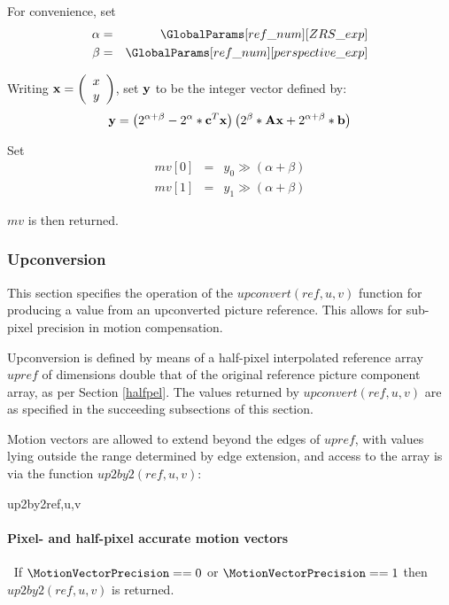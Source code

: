For convenience, set
\begin{eqnarray*} 
\alpha & = & \GlobalParams[ref\_num][ZRS\_exp] \\
\beta & = & \GlobalParams[ref\_num][perspective\_exp]
\end{eqnarray*}

Writing ${\bf x}=\left( \begin{array}{c} x\\y \end{array}\right)$, set ${\bf y}$ to be
the integer vector defined by:
\begin{equation*}
{\bf y}=\left(2^{\alpha+\beta}-2^\alpha * {\bf c}^T {\bf x}\right)\left(2^\beta*{\bf Ax}+2^{\alpha+\beta}*{\bf b}\right)
\end{equation*}

Set
\begin{eqnarray*}
mv[0] & = & y_0\gg (\alpha+\beta) \\
mv[1] & = & y_1\gg (\alpha+\beta)
\end{eqnarray*}

$mv$ is then returned.

\subsubsection{Upconversion}
\label{upconvert}

This section specifies the operation of the $upconvert(ref, u, v)$ function
for producing a value from an upconverted picture reference. This
allows for sub-pixel precision in motion compensation. 

Upconversion is defined by means of a half-pixel interpolated reference array
$upref$ of dimensions double that of the original reference picture component
array, as per Section \ref{halfpel}. The values returned by $upconvert(ref,u,v)$
are as specified in the succeeding subsections of this section.


Motion vectors are allowed to extend beyond the edges of $upref$, with values lying outside the range determined by edge extension,
and access to the array is via the function $up2by2(ref,u,v)$:

\begin{pseudo}{up2by2}{ref,u,v}
\end{pseudo}

\paragraph{Pixel- and half-pixel accurate motion vectors}
$\ $\newline
If $\MotionVectorPrecision==0$ or $\MotionVectorPrecision==1$ then $up2by2(ref,u,v)$
is returned.

